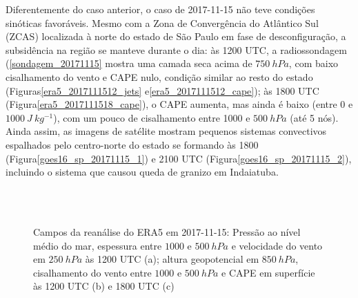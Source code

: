 Diferentemente do caso anterior, o caso de 2017-11-15 não teve condições sinóticas favoráveis. Mesmo com a Zona de Convergência do Atlântico Sul (ZCAS) localizada à norte do estado de São Paulo em fase de desconfiguração, a subsidência na região se manteve durante o dia: às 1200 UTC, a radiossondagem (\autoref{sondagem_20171115} mostra uma camada seca acima de $750\:hPa$, com baixo cisalhamento do vento e CAPE nulo, condição similar ao resto do estado (Figuras\autoref{era5_2017111512_jets} e\autoref{era5_2017111512_cape}); às 1800 UTC (Figura\autoref{era5_2017111518_cape}), o CAPE aumenta, mas ainda é baixo (entre 0 e $1000\:J\:kg^{-1}$), com um pouco de cisalhamento entre 1000 e $500\:hPa$ (até 5 nós). Ainda assim, as imagens de satélite mostram pequenos sistemas convectivos espalhados pelo centro-norte do estado se formando às 1800 (Figura\autoref{goes16_sp_20171115_1}) e 2100 UTC (Figura\autoref{goes16_sp_20171115_2}), incluindo o sistema que causou queda de granizo em Indaiatuba.

\begin{figure}[hp]
	\begin{center}
		\caption{Campos da reanálise do ERA5 em 2017-11-15: Pressão ao nível médio do mar, espessura entre $1000$ e $500\:hPa$ e velocidade do vento em $250\:hPa$ às 1200 UTC (a); altura geopotencial em $850\:hPa$, cisalhamento do vento entre $1000$ e $500\:hPa$ e CAPE em superfície às 1200 UTC (b) e 1800 UTC (c)} 
		\label{era5_20171115_main}
		 \\
		 \\
	\end{center}
\end{figure}

